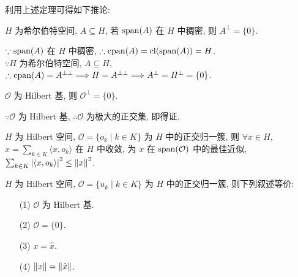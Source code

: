 \documentclass{note}
\begin{document}
利用上述定理可得如下推论:
\begin{thm}[(课本定理 13.14)]
    $H$ 为希尔伯特空间, $A\subseteq H$, 若 $\operatorname{span}(A)$ 在 $H$ 中稠密, 则 $A^{\perp}=\{0\}$.
\end{thm}
\begin{pf}
    $\because\operatorname{span}(A)$ 在 $H$ 中稠密, $\therefore\operatorname{cpan}(A)=\operatorname{cl}(\operatorname{span}(A))=H$.\\
    $\because H$ 为希尔伯特空间, $A\subseteq H$, $\therefore\operatorname{cpan}(A)=A^{\perp\perp}\Longrightarrow H=A^{\perp\perp}\Longrightarrow A^{\perp}=H^{\perp}=\{0\}$.\\
\end{pf}

\begin{thm}[(课本定理 13.15)]
    $\mathcal{O}$ 为 Hilbert 基, 则 $\mathcal{O}^{\perp}=\{0\}$.
\end{thm}
\begin{pf}
    $\because\mathcal{O}$ 为 Hilbert 基, $\therefore\mathcal{O}$ 为极大的正交集, 即得证.
\end{pf}

\begin{thm}[(课本定理 13.25)]
    $H$ 为 Hilbert 空间, $\mathcal{O}=\{o_k\mid k\in K\}$ 为 $H$ 中的正交归一簇, 则 $\forall x\in H$, $\hat{x}=\sum_{k\in K}\langle x,o_k\rangle$ 在 $H$ 中收敛, 为 $x$ 在 $\operatorname{span}(\mathcal{O})$ 中的最佳近似, $\sum_{k\in K}\left\lvert\langle x,o_k\rangle\right\rvert^2\leq\left\lVert x\right\rVert^2$.
\end{thm}

\begin{thm}[(课本定理 13.26)]
    $H$ 为 Hilbert 空间, $\mathcal{O}=\{u_k\mid k\in K\}$ 为 $H$ 中的正交归一簇, 则下列叙述等价:
    \begin{itemize}
        \item[(1)] $\mathcal{O}$ 为 Hilbert 基.
        \item[(2)] $\mathcal{O}=\{0\}$.
        \item[(3)] $x=\hat{x}$.
        \item[(4)] $\left\lVert x\right\rVert=\left\lVert\hat{x}\right\rVert$.
    \end{itemize}
\end{thm}
\ifx\allfiles\undefined
\end{document}
